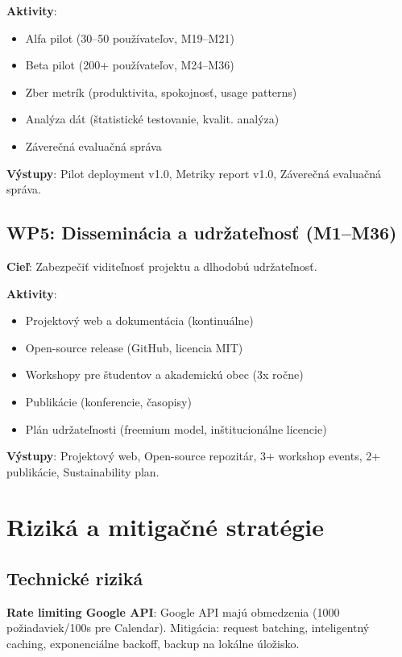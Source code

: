 \documentclass[10pt,twocolumn,twoside,slovak,a4paper]{article}
\begin{document}
\textbf{Aktivity}:
\begin{itemize}
\item Alfa pilot (30--50 používateľov, M19--M21)
\item Beta pilot (200+ používateľov, M24--M36)
\item Zber metrík (produktivita, spokojnosť, usage patterns)
\item Analýza dát (štatistické testovanie, kvalit. analýza)
\item Záverečná evaluačná správa
\end{itemize}

\textbf{Výstupy}: Pilot deployment v1.0, Metriky report v1.0, Záverečná evaluačná správa.

\subsection{WP5: Disseminácia a udržateľnosť (M1--M36)}

\textbf{Cieľ}: Zabezpečiť viditeľnosť projektu a dlhodobú udržateľnosť.

\textbf{Aktivity}:
\begin{itemize}
\item Projektový web a dokumentácia (kontinuálne)
\item Open-source release (GitHub, licencia MIT)
\item Workshopy pre študentov a akademickú obec (3x ročne)
\item Publikácie (konferencie, časopisy)
\item Plán udržateľnosti (freemium model, inštitucionálne licencie)
\end{itemize}

\textbf{Výstupy}: Projektový web, Open-source repozitár, 3+ workshop events, 2+ publikácie, Sustainability plan.

\section{Riziká a mitigačné stratégie}

\subsection{Technické riziká}

\textbf{Rate limiting Google API}: Google API majú obmedzenia (1000 požiadaviek/100s pre Calendar). Mitigácia: request batching, inteligentný caching, exponenciálne backoff, backup na lokálne úložisko.
\end{document}
